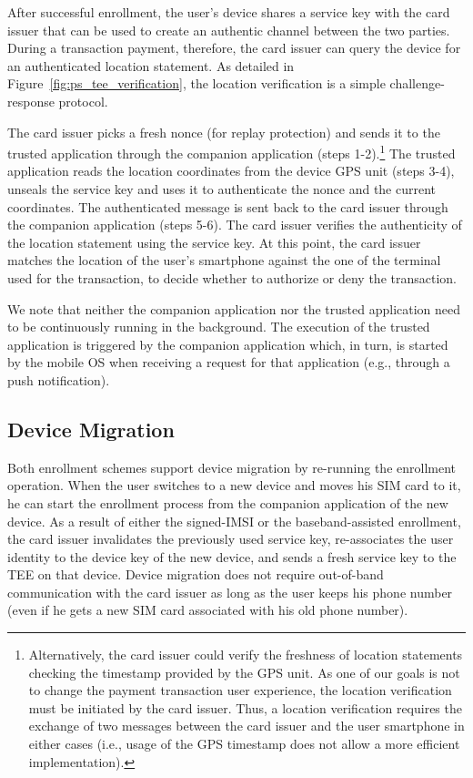 After successful enrollment, the user's device shares a service key with the
card issuer that can be used to create an authentic channel between the two
parties. During a transaction payment, therefore, the card issuer can query the
device for an authenticated location statement. As detailed in
Figure~\ref{fig:ps_tee_verification}, the location verification is a simple
challenge-response protocol.

The card issuer picks a fresh nonce (for replay protection) and sends it to the
trusted application through the companion application (steps
1-2).\footnote{Alternatively, the card issuer could verify the freshness of
  location statements checking the timestamp provided by the GPS unit. As one of
  our goals is not to change the payment transaction user experience, the
  location verification must be initiated by the card issuer. Thus, a location
  verification requires the exchange of two messages between the card issuer and
  the user smartphone in either cases (i.e., usage of the GPS timestamp does not
  allow a more efficient implementation).}  The trusted application reads the
location coordinates from the device GPS unit (steps 3-4), unseals the service
key and uses it to authenticate the nonce and the current coordinates. The
authenticated message is sent back to the card issuer through the companion
application (steps 5-6).  The card issuer verifies the authenticity of the
location statement using the service key. At this point, the card issuer matches
the location of the user's smartphone against the one of the terminal used for
the transaction, to decide whether to authorize or deny the transaction.

We note that neither the companion application nor the trusted application need
to be continuously running in the background. The execution of the trusted
application is triggered by the companion application which, in turn, is started
by the mobile OS when receiving a request for that application (e.g., through a
push notification).

\subsection{Device Migration}

Both enrollment schemes support device migration by re-running the enrollment
operation. When the user switches to a new device and moves his SIM card to it,
he can start the enrollment process from the companion application of the new
device. As a result of either the signed-IMSI or the baseband-assisted
enrollment, the card issuer invalidates the previously used service key,
re-associates the user identity to the device key of the new device, and sends a
fresh service key to the TEE on that device. Device migration does not require
out-of-band communication with the card issuer as long as the user keeps his
phone number (even if he gets a new SIM card associated with his old phone
number).

